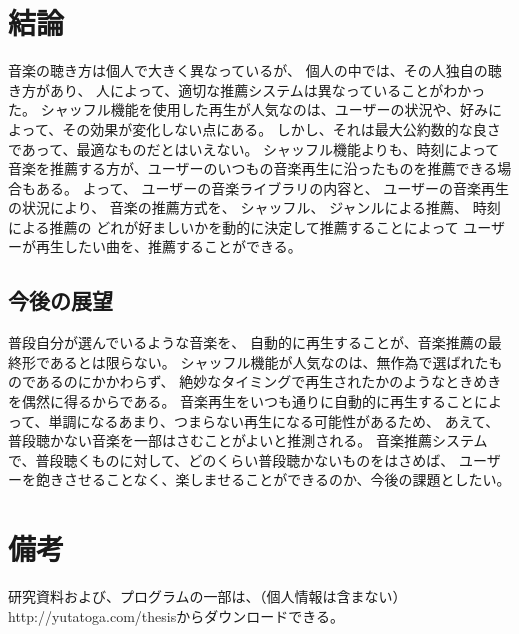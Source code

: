 \documentclass[11pt, onecolumn]{jsarticle}
\begin{document}
\section{結論}
音楽の聴き方は個人で大きく異なっているが、
個人の中では、その人独自の聴き方があり、
人によって、適切な推薦システムは異なっていることがわかった。
シャッフル機能を使用した再生が人気なのは、ユーザーの状況や、好みによって、その効果が変化しない点にある。
しかし、それは最大公約数的な良さであって、最適なものだとはいえない。
シャッフル機能よりも、時刻によって音楽を推薦する方が、ユーザーのいつもの音楽再生に沿ったものを推薦できる場合もある。
よって、
ユーザーの音楽ライブラリの内容と、
ユーザーの音楽再生の状況により、
音楽の推薦方式を、
シャッフル、
ジャンルによる推薦、
時刻による推薦の
どれが好ましいかを動的に決定して推薦することによって
ユーザーが再生したい曲を、推薦することができる。

\subsection{今後の展望}
普段自分が選んでいるような音楽を、
自動的に再生することが、音楽推薦の最終形であるとは限らない。
シャッフル機能が人気なのは、無作為で選ばれたものであるのにかかわらず、
絶妙なタイミングで再生されたかのようなときめきを偶然に得るからである。
音楽再生をいつも通りに自動的に再生することによって、単調になるあまり、つまらない再生になる可能性があるため、
あえて、普段聴かない音楽を一部はさむことがよいと推測される。
音楽推薦システムで、普段聴くものに対して、どのくらい普段聴かないものをはさめば、
ユーザーを飽きさせることなく、楽しませることができるのか、今後の課題としたい。

\section{備考}
研究資料および、プログラムの一部は、（個人情報は含まない）
http://yutatoga.com/thesisからダウンロードできる。
\end{document}
